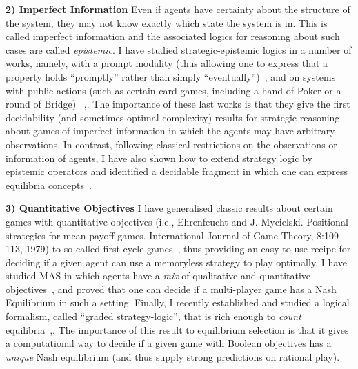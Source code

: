 \documentclass[a4paper,10pt]{scrartcl}
\begin{document}
 \textbf{2) Imperfect Information} Even if agents have certainty about the structure of the system, they may not know exactly which state the system is in. This is called imperfect information and the associated logics for reasoning about such cases are called \emph{epistemic}. I have studied strategic-epistemic logics in a number of works, namely, with a prompt modality (thus allowing one to express that a property holds ``promptly'' rather than simply ``eventually'')~, and on systems with public-actions (such as certain card games, including a hand of Poker or a round of Bridge)~
,. The importance of these last works is that they give the first decidability (and sometimes optimal complexity) results for strategic reasoning about games of imperfect information in which the agents may have arbitrary observations. In contrast, following classical restrictions on the observations or information of agents, I have also shown how to extend strategy logic by epistemic operators and identified a decidable fragment in which one can express equilibria concepts~.
 

\textbf{3) Quantitative Objectives}
I have generalised classic results about certain games with quantitative objectives (i.e., Ehrenfeucht and J. Mycielski. Positional strategies for mean payoff games. International Journal of Game Theory, 8:109--113, 1979) to so-called first-cycle games~, thus providing an easy-to-use recipe for deciding if a given agent can use a memoryless strategy to play optimally. I have studied MAS in which agents have a \emph{mix} of qualitative and quantitative objectives~, and proved that one can decide if a multi-player game has a Nash Equilibrium in such a setting. Finally,  I recently established and studied a logical formalism, called ``graded strategy-logic'', that is rich enough to \emph{count} equilibria~,. 
The importance of this result to equilibrium selection is that it gives a computational way to decide if a given game with Boolean objectives has a \emph{unique} Nash equilibrium (and thus supply strong predictions on rational play).
\end{document}
